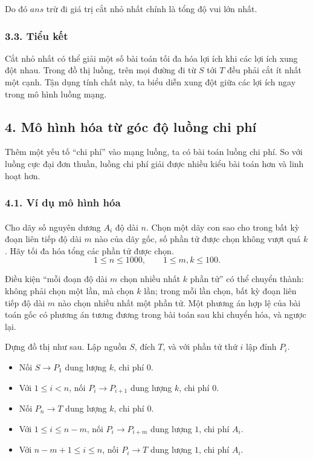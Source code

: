 \documentclass[11pt]{article}
\begin{document}
Do đó \(ans\) trừ đi giá trị cắt nhỏ nhất chính là tổng độ vui lớn nhất.

\subsubsection*{3.3. Tiểu kết}

Cắt nhỏ nhất có thể giải một số bài toán tối đa hóa lợi ích khi các lợi ích
xung đột nhau. Trong đồ thị luồng, trên mọi đường đi từ \(S\) tới \(T\) đều
phải cắt ít nhất một cạnh. Tận dụng tính chất này, ta biểu diễn xung đột giữa
các lợi ích ngay trong mô hình luồng mạng.

\subsection*{4. Mô hình hóa từ góc độ luồng chi phí}

Thêm một yếu tố ``chi phí'' vào mạng luồng, ta có bài toán luồng chi phí.
So với luồng cực đại đơn thuần, luồng chi phí giải được nhiều kiểu bài toán
hơn và linh hoạt hơn.

\subsubsection*{4.1. Ví dụ mô hình hóa}

\paragraph{}
Cho dãy số nguyên dương \(A_i\) độ dài \(n\). Chọn một dãy con sao cho trong
bất kỳ đoạn liên tiếp độ dài \(m\) nào của dãy gốc, số phần tử được chọn không
vượt quá \(k\). Hãy tối đa hóa tổng các phần tử được chọn.
\[
  1\le n\le 1000,\qquad 1\le m,k\le 100.
\]

Điều kiện ``mỗi đoạn độ dài \(m\) chọn nhiều nhất \(k\) phần tử'' có thể
chuyển thành: không phải chọn một lần, mà chọn \(k\) lần; trong mỗi lần chọn,
bất kỳ đoạn liên tiếp độ dài \(m\) nào chọn nhiều nhất một phần tử. Một phương
án hợp lệ của bài toán gốc có phương án tương đương trong bài toán sau khi
chuyển hóa, và ngược lại.

Dựng đồ thị như sau. Lập nguồn \(S\), đích \(T\), và với phần tử thứ \(i\)
lập đỉnh \(P_i\).
\begin{itemize}
  \item Nối \(S\to P_1\) dung lượng \(k\), chi phí \(0\).
  \item Với \(1\le i<n\), nối \(P_i\to P_{i+1}\) dung lượng \(k\), chi phí
  \(0\).
  \item Nối \(P_n\to T\) dung lượng \(k\), chi phí \(0\).
  \item Với \(1\le i\le n-m\), nối \(P_i\to P_{i+m}\) dung lượng \(1\), chi
  phí \(A_i\).
  \item Với \(n-m+1\le i\le n\), nối \(P_i\to T\) dung lượng \(1\), chi phí
  \(A_i\).
\end{itemize}
\end{document}

